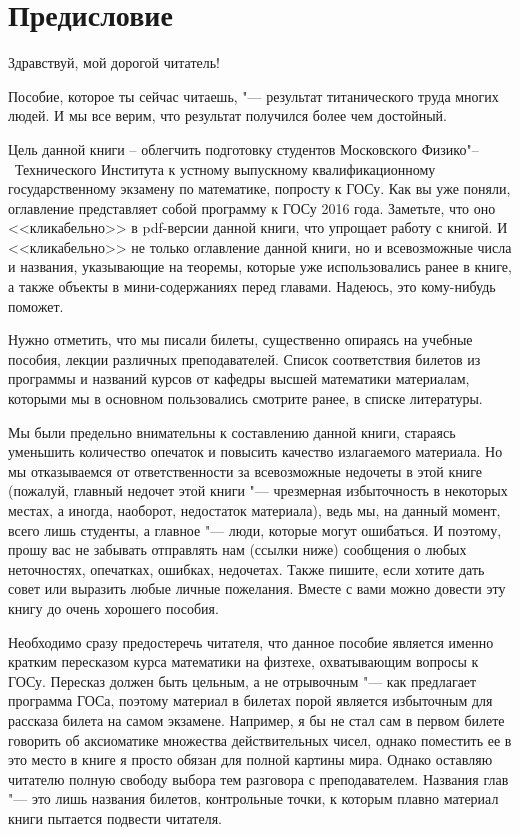 \chapter{Предисловие}

\begin{center} 
	Здравствуй, мой дорогой читатель!
\end{center}

Пособие, которое ты сейчас читаешь, "--- результат титанического труда многих людей. И мы все верим, что результат получился более чем достойный. 

Цель данной книги – облегчить подготовку студентов Московского Физико"--~Технического Института к устному выпускному квалификационному государственному экзамену по математике, попросту к ГОСу. Как вы уже поняли, оглавление представляет собой программу к ГОСу 2016 года. Заметьте, что оно <<кликабельно>> в pdf-версии данной книги, что упрощает работу с книгой. И <<кликабельно>> не только оглавление данной книги, но и всевозможные числа и названия, указывающие на теоремы, которые уже использовались ранее в книге, а также объекты в мини-содержаниях перед главами. Надеюсь, это кому-нибудь поможет. 

Нужно отметить, что мы писали билеты, существенно опираясь на учебные пособия, лекции различных преподавателей. Список соответствия билетов из программы и названий курсов от кафедры высшей математики материалам, которыми мы в основном пользовались смотрите ранее, в списке литературы.

Мы были предельно внимательны к составлению данной книги, стараясь уменьшить количество опечаток и повысить качество излагаемого материала. Но мы отказываемся от ответственности за всевозможные недочеты в этой книге (пожалуй, главный недочет этой книги "--- чрезмерная избыточность в некоторых местах, а иногда, наоборот, недостаток материала), ведь мы, на данный момент, всего лишь студенты, а главное "--- люди, которые могут ошибаться. И поэтому, прошу вас не забывать отправлять нам (ссылки ниже) сообщения о любых неточностях, опечатках, ошибках, недочетах. Также пишите, если хотите дать совет или выразить любые личные пожелания. Вместе с вами можно довести эту книгу до очень хорошего пособия.

Необходимо сразу предостеречь читателя, что данное пособие является именно кратким пересказом курса математики на физтехе, охватывающим вопросы к ГОСу. Пересказ должен быть цельным, а не отрывочным "--- как предлагает программа ГОСа, поэтому материал в билетах порой является избыточным для рассказа билета на самом экзамене. Например, я бы не стал сам в первом билете говорить об аксиоматике множества действительных чисел, однако поместить ее в это место в книге я просто обязан для полной картины мира. Однако оставляю читателю полную свободу выбора тем разговора с преподавателем. Названия глав "--- это лишь названия билетов, контрольные точки, к которым плавно материал книги пытается подвести читателя.

